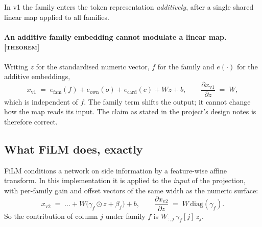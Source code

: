 \documentclass[11pt,a4paper]{article}
\newcommand{\tagT}{\textsc{[theorem]}}
\begin{document}
In v1 the family enters the token representation \emph{additively}, after a
single shared linear map applied to all families.

\paragraph{An additive family embedding cannot modulate a linear map. \tagT}
Writing $z$ for the standardised numeric vector, $f$ for the family and $e(\cdot)$
for the additive embeddings,
\[
x_{\text{v1}} \;=\; e_{\text{fam}}(f) + e_{\text{own}}(o) + e_{\text{card}}(c) + Wz + b,
\qquad
\frac{\partial x_{\text{v1}}}{\partial z} \;=\; W ,
\]
which is independent of $f$. The family term shifts the output; it cannot change
how the map reads its input. The claim as stated in the project's design notes
is therefore correct.

\subsection{What FiLM does, exactly}

FiLM \cite{perez2018film} conditions a network on side information by a
feature-wise affine transform. In this implementation it is applied to the
\emph{input} of the projection, with per-family gain and offset vectors of the
same width as the numeric surface:
\[
x_{\text{v2}} \;=\; \dots + W\big(\gamma_f \odot z + \beta_f\big) + b,
\qquad
\frac{\partial x_{\text{v2}}}{\partial z} \;=\; W\,\mathrm{diag}(\gamma_f).
\]
So the contribution of column $j$ under family $f$ is $W_{:,j}\,\gamma_f[j]\,z_j$.
\end{document}
